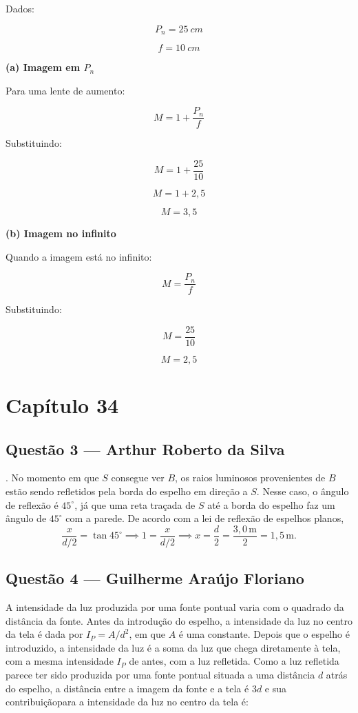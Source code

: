 \documentclass[12pt,a4paper]{article}
\begin{document}
\vspace{0.5cm}

Dados:

\[
P_n=25\ cm
\]

\[
f=10\ cm
\]

\vspace{0.5cm}

\textbf{(a) Imagem em \(P_n\)}

Para uma lente de aumento:

\[
M=1+\frac{P_n}{f}
\]

Substituindo:

\[
M=1+\frac{25}{10}
\]

\[
M=1+2,5
\]

\[
M=3,5
\]

\vspace{0.5cm}

\textbf{(b) Imagem no infinito}

Quando a imagem está no infinito:

\[
M=\frac{P_n}{f}
\]

Substituindo:

\[
M=\frac{25}{10}
\]

\[
M=2,5
\]


\section{Capítulo 34}

\subsection{Questão 3 — Arthur Roberto da Silva}
. No momento em que $S$ consegue ver $B$, os raios luminosos provenientes de $B$ estão sendo refletidos pela borda do espelho em direção a $S$. Nesse caso, o ângulo de reflexão é $45^\circ$, já que uma reta traçada de $S$ até a borda do espelho faz um ângulo de $45^\circ$ com a parede. De acordo com a lei de reflexão de espelhos planos,
\[
\frac{x}{d/2} = \tan 45^\circ \implies 1 = \frac{x}{d/2} \implies x = \frac{d}{2} = \frac{3,0 \, \text{m}}{2} = 1,5 \, \text{m}.
\]

\subsection{Questão 4 — Guilherme Araújo Floriano}

A intensidade da luz produzida por uma fonte pontual varia com o quadrado da distância da fonte. Antes da introdução do espelho, a intensidade da luz no centro da tela é dada por $I_P = A/d^2$, em que $A$ é uma constante. Depois que o espelho é introduzido, a intensidade da luz é a soma da luz que chega diretamente à tela, com a mesma intensidade $I_P$ de antes, com a luz refletida. Como a luz refletida parece ter sido produzida por uma fonte pontual situada a uma distância $d$ atrás do espelho, a distância entre a imagem da fonte e a tela é $3d$ e sua contribuiçãopara a intensidade da luz no centro da tela é:
\end{document}
